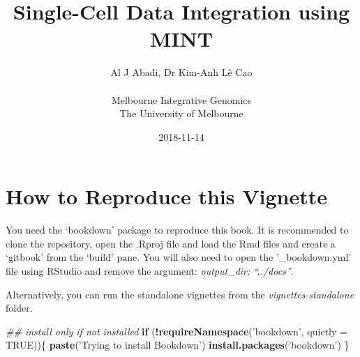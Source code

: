 \documentclass[]{book}
\title{Single-Cell Data Integration using MINT}
\author{Al J Abadi, Dr Kim-Anh Lê Cao\\
~\\
Melbourne Integrative Genomics\\
The University of Melbourne}
\date{2018-11-14}
\newenvironment{Shaded}{\begin{snugshade}}{\end{snugshade}}
\newcommand{\CommentTok}[1]{\textcolor[rgb]{0.56,0.35,0.01}{\textit{#1}}}
\newcommand{\ControlFlowTok}[1]{\textcolor[rgb]{0.13,0.29,0.53}{\textbf{#1}}}
\newcommand{\DataTypeTok}[1]{\textcolor[rgb]{0.13,0.29,0.53}{#1}}
\newcommand{\KeywordTok}[1]{\textcolor[rgb]{0.13,0.29,0.53}{\textbf{#1}}}
\newcommand{\NormalTok}[1]{#1}
\newcommand{\OperatorTok}[1]{\textcolor[rgb]{0.81,0.36,0.00}{\textbf{#1}}}
\newcommand{\OtherTok}[1]{\textcolor[rgb]{0.56,0.35,0.01}{#1}}
\newcommand{\StringTok}[1]{\textcolor[rgb]{0.31,0.60,0.02}{#1}}
\theoremstyle{definition}
\theoremstyle{definition}
\theoremstyle{definition}
\theoremstyle{remark}
\begin{document}
\maketitle

{
\setcounter{tocdepth}{1}
\tableofcontents
}
\hypertarget{how-to-reproduce-this-vignette}{%
\chapter{How to Reproduce this
Vignette}\label{how-to-reproduce-this-vignette}}

You need the `bookdown' package to reproduce this book. It is
recommended to clone the repository, open the .Rproj file and load the
Rmd files and create a `gitbook' from the `build' pane. You will also
need to open the '\_bookdown.yml' file using RStudio and remove the
argument: \emph{output\_dir: ``../docs''}.

Alternatively, you can run the standalone vignettes from the
\emph{vignettes-standalone} folder.

\begin{Shaded}
\begin{Highlighting}[]
\CommentTok{## install only if not installed}
\ControlFlowTok{if}\NormalTok{ (}\OperatorTok{!}\KeywordTok{requireNamespace}\NormalTok{(}\StringTok{'bookdown'}\NormalTok{, }\DataTypeTok{quietly =} \OtherTok{TRUE}\NormalTok{))\{}
  \KeywordTok{paste}\NormalTok{(}\StringTok{'Trying to install Bookdown'}\NormalTok{)}
  \KeywordTok{install.packages}\NormalTok{(}\StringTok{'bookdown'}\NormalTok{)}
\NormalTok{\}}
\end{Highlighting}
\end{Shaded}
\end{document}

